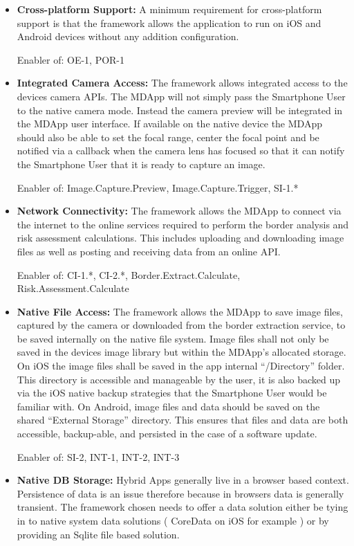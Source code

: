 \begin{itemize}[label={}]
\item \textbf{Cross-platform Support:} A minimum requirement for cross-platform support is that the framework allows the application to run on iOS and Android devices without any addition configuration.

Enabler of: OE-1, POR-1

\item \textbf{Integrated Camera Access:} The framework allows integrated access to the devices camera APIs. The MDApp will not simply pass the Smartphone User to the native camera mode. Instead the camera preview will be integrated in the MDApp user interface. If available on the native device the MDApp should also be able to set the focal range, center the focal point and be notified via a callback when the camera lens has focused so that it can notify the Smartphone User that it is ready to capture an image.

Enabler of: Image.Capture.Preview, Image.Capture.Trigger, SI-1.*

\item \textbf{Network Connectivity:} The framework allows the MDApp to connect via the internet to the online services required to perform the border analysis and risk assessment calculations. This includes uploading and downloading image files as well as posting and receiving data from an online API.

Enabler of: CI-1.*, CI-2.*, Border.Extract.Calculate, Risk.Assessment.Calculate

\item \textbf{Native File Access:} The framework allows the MDApp to save image files, captured by the camera or downloaded from the border extraction service, to be saved internally on the native file system. Image files shall not only be saved in the devices image library but within the MDApp’s allocated storage. On iOS the image files shall be saved in the app internal “/Directory” folder. This directory is accessible and manageable by the user, it is also backed up via the iOS native backup strategies that the Smartphone User would be familiar with. On Android, image files and data should be saved on the shared “External Storage” directory. This ensures that files and data are both accessible, backup-able, and persisted in the case of a software update.

Enabler of: SI-2, INT-1, INT-2, INT-3

\item \textbf{Native DB Storage:} Hybrid Apps generally live in a browser based context. Persistence of data is an issue therefore because in browsers data is generally transient. The framework chosen needs to offer a data solution either be tying in to native system data solutions ( CoreData on iOS for example ) or by providing an Sqlite file based solution.


\end{itemize}
